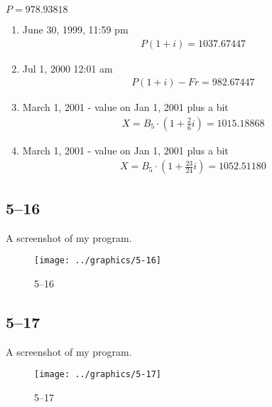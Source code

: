 \documentclass[a4paper, 12pt, reqno]{amsart}
\begin{document}
$P = 978.93818$
\begin{enumerate}
    \item June 30, 1999, 11:59 pm
        \begin{equation}\nonumber
            \begin{gathered}
                P(1+i) = 1037.67447
            \end{gathered}
        \end{equation}
    \item Jul 1, 2000 12:01 am
        \begin{equation}\nonumber
            \begin{gathered}
                P(1+i) - Fr = 982.67447
            \end{gathered}
        \end{equation}
    \item March 1, 2001 - value on Jan 1, 2001 plus a bit
        \begin{equation}\nonumber
            \begin{gathered}
                X = B_5 \cdot (1 + \frac{2}{6}i) = 1015.18868
            \end{gathered}
        \end{equation}
    \item March 1, 2001 - value on Jan 1, 2001 plus a bit
        \begin{equation}\nonumber
            \begin{gathered}
                X = B_5 \cdot (1 + \frac{23}{24}i) = 1052.51180
            \end{gathered}
        \end{equation}
\end{enumerate}

\subsection*{5--16}

A screenshot of my program.
\begin{figure}[H]
    \texttt{[image: ../graphics/5-16]}
    \caption{5--16}
\end{figure}

\subsection*{5--17}

A screenshot of my program.
\begin{figure}[H]
    \texttt{[image: ../graphics/5-17]}
    \caption{5--17}
\end{figure}
\end{document}
